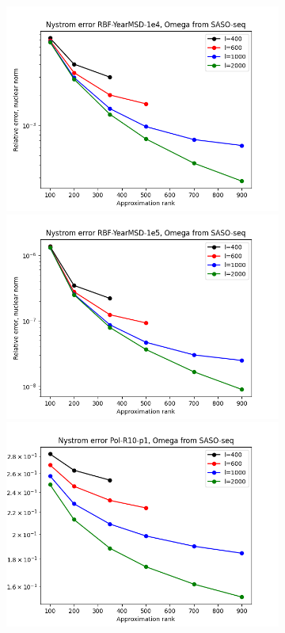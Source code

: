 \documentclass{article}
\theoremstyle{definition}
\begin{document}
\begin{appendices}
\begin{figure}
\begin{subfigure}[t]{0.35\textwidth}
    \includegraphics[width=\textwidth]{plots/relerror/relerror_RBF-YearMSD-1e4_SASO-seq.png}
    \includegraphics[width=\textwidth]{plots/relerror/relerror_RBF-YearMSD-1e5_SASO-seq.png}
    \includegraphics[width=\textwidth]{plots/relerror/relerror_Pol-R10-p1_SASO-seq.png}

\end{subfigure}
\end{figure}
\end{appendices}
\end{document}
